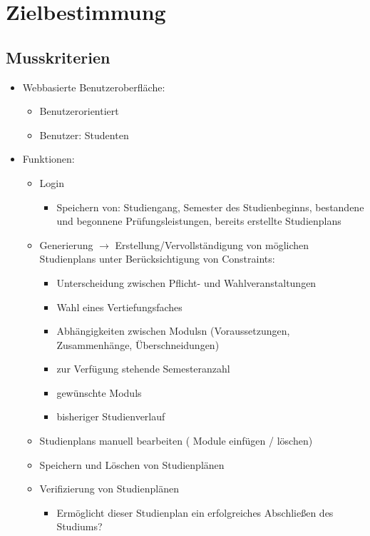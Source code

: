 \section{Zielbestimmung}

\subsection{Musskriterien}
\begin{itemize}[nosep]
	\item Webbasierte Benutzeroberfläche:
	\begin{itemize}[nosep]
		\item Benutzerorientiert 
		\item \gls{Benutzer}: Studenten
	\end{itemize}
	\item Funktionen:
	\begin{itemize}[nosep]
		\item Login
			\begin{itemize}[nosep]
					\item Speichern von: \gls{Studiengang}, \gls{Semester des Studienbeginns}, bestandene und begonnene Prüfungsleistungen, bereits erstellte \glspl{Studienplan}
				\end{itemize}
		\item Generierung $\rightarrow$ Erstellung/Vervollständigung von möglichen \glspl{Studienplan} unter Berücksichtigung von Constraints:
		\begin{itemize}[nosep]
			\item Unterscheidung zwischen Pflicht- und Wahlveranstaltungen
			\item Wahl eines Vertiefungsfaches
			\item Abhängigkeiten zwischen \glspl{Modul}n (Voraussetzungen, Zusammenhänge, Überschneidungen)
			\item zur Verfügung stehende Semesteranzahl
			\item gewünschte \glspl{Modul}
			\item bisheriger Studienverlauf
			\end{itemize}
		\item \glspl{Studienplan} manuell bearbeiten ( Module einfügen / löschen)
		\item Speichern und Löschen von Studienplänen
		\item Verifizierung von Studienplänen
		\begin{itemize}[nosep]
			\item Ermöglicht dieser Studienplan ein erfolgreiches Abschließen des Studiums?

\end{itemize}
\end{itemize}
\end{itemize}
